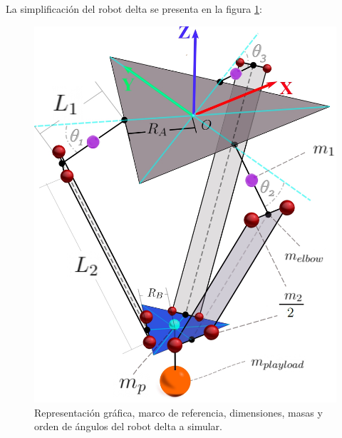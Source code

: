     \newpage
    
     La simplificación del robot delta se presenta en la figura \ref{fig:cap5_1}:
    
    \begin{figure}[htb]
        \centering
        \includegraphics[width=0.87\linewidth]{Main/Chapter5/Images5/DIBUJO55.jpg}
        \caption{Representación gráfica, marco de referencia, dimensiones, masas y orden de ángulos del robot delta a simular.}
        \label{fig:cap5_1}
    \end{figure}
    
    
    